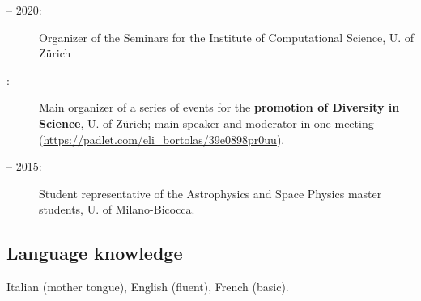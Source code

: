 \begin{description}

    \item[  -- 2020:] Organizer of the Seminars for the Institute of Computational Science, U. of Z\"urich
    
    \item[ :] Main organizer of a series of  events  for the \textbf{promotion of Diversity in Science}, U. of Z\"urich; main speaker and moderator in one meeting (\href{https://padlet.com/eli_bortolas/39e0898pr0uu}{https://padlet.com/eli\_bortolas/39e0898pr0uu}).

    \item[  -- 2015:] Student representative of the Astrophysics and Space Physics master students, U. of Milano-Bicocca.
    
\end{description}


\subsection*{Language knowledge}
Italian (mother tongue), English (fluent), French (basic).%
